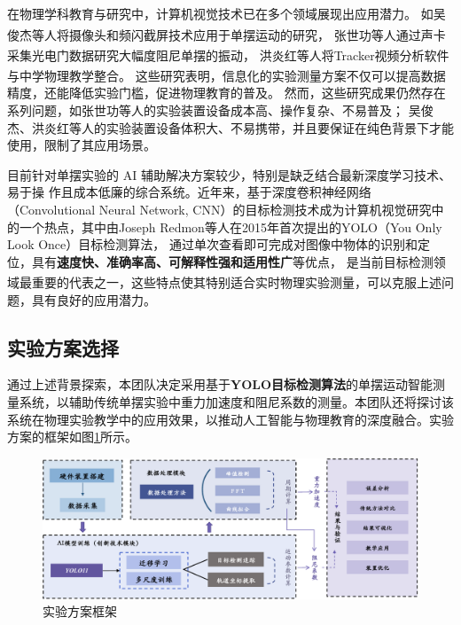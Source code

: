 在物理学科教育与研究中，计算机视觉技术已在多个领域展现出应用潜力。
如吴俊杰等人将摄像头和频闪截屏技术应用于单摆运动的研究\textsuperscript{\cite{WUJS200610016}}，
张世功等人通过声卡采集光电门数据研究大幅度阻尼单摆的振动\textsuperscript{\cite{DWSL202206016}}，
洪炎红等人将Tracker视频分析软件与中学物理教学整合\textsuperscript{\cite{WLTB201706010}}。
这些研究表明，信息化的实验测量方案不仅可以提高数据精度，还能降低实验门槛，促进物理教育的普及。
然而，这些研究成果仍然存在系列问题，如张世功等人的实验装置设备成本高、操作复杂、不易普及；
吴俊杰、洪炎红等人的实验装置设备体积大、不易携带，并且要保证在纯色背景下才能使用，限制了其应用场景。

目前针对单摆实验的 AI 辅助解决方案较少，特别是缺乏结合最新深度学习技术、易于操
作且成本低廉的综合系统。近年来，基于深度卷积神经网络（Convolutional Neural Network, CNN）的目标检测技术成为计算机视觉研究中
的一个热点，其中由Joseph Redmon等人在2015年首次提出的YOLO（You Only Look Once）目标检测算法，
通过单次查看即可完成对图像中物体的识别和定位，具有\textbf{速度快、准确率高、可解释性强和适用性广}等优点，
是当前目标检测领域最重要的代表之一\textsuperscript{\cite{jiang2022review}}，这些特点使其特别适合实时物理实验测量，可以克服上述问题，具有良好的应用潜力。


\subsection{实验方案选择}
通过上述背景探索，本团队决定采用基于\textbf{YOLO目标检测算法}的单摆运动智能测量系统，以辅助传统单摆实验中重力加速度和阻尼系数的测量。本团队还将探讨该系统在物理实验教学中的应用效果，以推动人工智能与物理教育的深度融合。实验方案的框架如图\ref{实验方案框架}所示。


\begin{figure}[ht]
    \centering
    \includegraphics[width=1\textwidth]{figures/实验方案框架}
    \caption{实验方案框架}
    \label{实验方案框架}
\end{figure} 